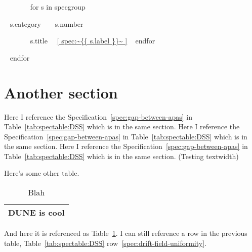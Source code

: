 \documentclass{article}
\begin{document}
\begin{description}
  ~{ for s in specgroup }~
  \item[ ~{{ s.category }}~ ~{{ s.number }}~ ] ~{{ s.title }}~~\ref{ spec:~{{ s.label }}~ }
  ~{ endfor }~
\end{description}
~{ endfor }~


\section{Another section}


Here I reference the Specification~\ref{spec:gap-between-apas} in Table~\ref{tab:spectable:DSS} which is in the same section. Here I reference the Specification~\ref{spec:gap-between-apas} in Table~\ref{tab:spectable:DSS} which is in the same section. Here I reference the Specification~\ref{spec:gap-between-apas} in Table~\ref{tab:spectable:DSS} which is in the same section. (Testing textwidth)


Here's some other table.

\begin{table}[htp]
  \caption{Blah}
  \centering
  \begin{tabular}{|c|}
    \hline
    \label{row:cool} DUNE is cool \\
    \hline
  \end{tabular}
  \label{tab:cool}
\end{table}

And here it is referenced as Table~\ref{tab:cool}.  
I can still reference a row in the previous table,
Table~\ref{tab:spectable:DSS}
row~\ref{spec:drift-field-uniformity}.
\end{document}
